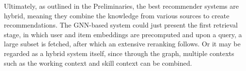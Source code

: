  Ultimately, as outlined in the Preliminaries, the best recommender systems are hybrid, meaning they combine the knowledge from various sources to create recommendations. The GNN-based system could just present the first retrieval stage, in which user and item embeddings are precomputed and upon a query, a large subset is fetched, after which an extensive reranking follows.  Or it may be regarded as a hybrid system itself, since through the graph, multiple contexts such as the working context and skill context can be combined.










